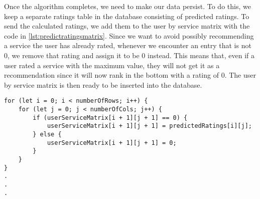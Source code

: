 Once the algorithm completes, we need to make our data persist.
To do this, we keep a separate ratings table in the database consisting of predicted ratings.
To send the calculated ratings, we add them to the user by service matrix with the code in \autoref{lst:predictratingsmatrix}.
Since we want to avoid possibly recommending a service the user has already rated, whenever we encounter an entry that is not 0, we remove that rating and assign it to be 0 instead.
This means that, even if a user rated a service with the maximum value, they will not get it as a recommendation since it will now rank in the bottom with a rating of 0.
The user by service matrix is then ready to be inserted into the database.
\begin{lstlisting}[caption={Adding the predictions to the ratings matrix}, captionpos=b, label={lst:predictratingsmatrix}]
for (let i = 0; i < numberOfRows; i++) {
    for (let j = 0; j < numberOfCols; j++) {
        if (userServiceMatrix[i + 1][j + 1] == 0) {
            userServiceMatrix[i + 1][j + 1] = predictedRatings[i][j];
        } else {
            userServiceMatrix[i + 1][j + 1] = 0;
        }
    }
}
.
.
.
\end{lstlisting}

